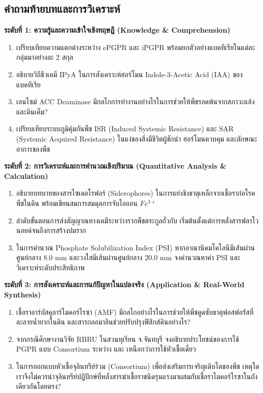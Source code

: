 \subsection*{คำถามท้ายบทและการวิเคราะห์}

\noindent \textbf{ระดับที่ 1: ความรู้และความเข้าใจเชิงทฤษฎี (Knowledge \& Comprehension)}
\begin{enumerate}
    \item เปรียบเทียบความแตกต่างระหว่าง ePGPR และ iPGPR พร้อมยกตัวอย่างแบคทีเรียในแต่ละกลุ่มมาอย่างละ 2 สกุล
    \item อธิบายวิถีชีวเคมี IPyA ในการสังเคราะห์ฮอร์โมน Indole-3-Acetic Acid (IAA) ของแบคทีเรีย 
    \item เอนไซม์ ACC Deaminase มีกลไกการทำงานอย่างไรในการช่วยให้พืชรอดพ้นจากสภาวะแล้งและดินเค็ม?
    \item เปรียบเทียบระบบภูมิคุ้มกันพืช ISR (Induced Systemic Resistance) และ SAR (Systemic Acquired Resistance) ในแง่ของสิ่งมีชีวิตผู้ชักนำ ฮอร์โมนควบคุม และลักษณะอาการของพืช
\end{enumerate}

\noindent \textbf{ระดับที่ 2: การวิเคราะห์และการคำนวณเชิงปริมาณ (Quantitative Analysis \& Calculation)}
\begin{enumerate}[resume]
    \item อธิบายบทบาทของสารไซเดอโรฟอร์ (Siderophores) ในการแย่งชิงธาตุเหล็กจากเชื้อราก่อโรคพืชในดิน พร้อมเขียนสมการสมดุลการจับไอออน $Fe^{3+}$
    \item ลำดับขั้นตอนการส่งสัญญาณทางเคมีระหว่างรากพืชตระกูลถั่วกับ  เริ่มต้นตั้งแต่การหลั่งสารฟลาโวนอยด์จนถึงการสร้างปมราก
    \item ในการคำนวณ Phosphate Solubilization Index (PSI) หากอาณานิคมโคโลนีมีเส้นผ่านศูนย์กลาง $8.0\text{ mm}$ และวงใสมีเส้นผ่านศูนย์กลาง $20.0\text{ mm}$ จงคำนวณหาค่า PSI และวิเคราะห์ระดับประสิทธิภาพ
\end{enumerate}

\noindent \textbf{ระดับที่ 3: การสังเคราะห์และการแก้ปัญหาในแปลงจริง (Application \& Real-World Synthesis)}
\begin{enumerate}[resume]
    \item เชื้อราอาร์บัสคูลาร์ไมคอร์ไรซา (AMF) มีกลไกอย่างไรในการช่วยให้พืชดูดซับธาตุฟอสฟอรัสที่ละลายน้ำยากในดิน และสารกลอมาลินช่วยปรับปรุงฟิสิกส์ดินอย่างไร?
    \item จากกรณีศึกษางานวิจัย RBRU ในสวนทุเรียน จ.จันทบุรี จงอธิบายประโยชน์ของการใช้ PGPR แบบ Consortium ระหว่าง  และ  เหนือกว่าการใช้หัวเชื้อเดี่ยว
    \item ในการออกแบบหัวเชื้อจุลินทรีย์ร่วม (Consortium) เพื่อส่งเสริมการเจริญเติบโตของพืช เหตุใดเราจึงไม่ควรนำจุลินทรีย์ปฏิปักษ์ที่หลั่งสารฆ่าเชื้อราชนิดรุนแรงมาผสมกับเชื้อราไมคอร์ไรซาในถังเดียวกันโดยตรง?
\end{enumerate}
